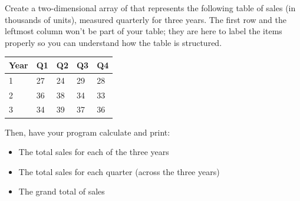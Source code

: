 \begin{exercise}
Create a two-dimensional array of  that represents the following table of sales (in thousands of units), measured quarterly for three years. The first row and the leftmost column won't be part of your table; they are here to label the items properly so you can understand how the table is structured.

\begin{tabular}{|l|l|l|l|l|}
\hline
Year & Q1 & Q2 & Q3 & Q4 \\ \hline
1     & 27 & 24 & 29 & 28 \\ \hline
2     & 36 & 38 & 34 & 33 \\ \hline
3     & 34 & 39 & 37 & 36 \\ \hline
\end{tabular}

Then, have your program calculate and print:

\begin{itemize}
\item The total sales for each of the three years
\item The total sales for each quarter (across the three years)
\item The grand total of sales
\end{itemize}
\end{exercise}

